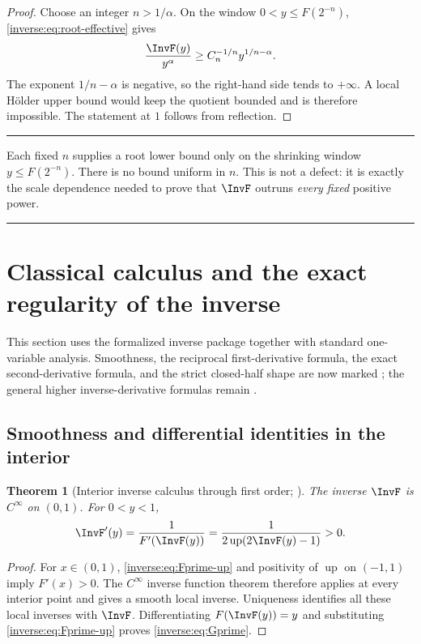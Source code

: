 \documentclass[11pt,oneside]{article}
\newtheorem{theorem}{Theorem}[section]
\theoremstyle{definition}
\theoremstyle{remark}
\newcommand{\Up}{\operatorname{up}}
\newenvironment{boxedremark}{%
  \par\smallskip\noindent\begin{center}\begin{minipage}{0.94\textwidth}%
  \color{black}\hrule\vspace{0.6em}\small
}{%
  \vspace{0.6em}\hrule\end{minipage}\end{center}\smallskip
}
\begin{document}
\begin{proof}
Choose an integer $n>1/\alpha$.  On the window
$0<y\leq F(2^{-n})$, \cref{inverse:eq:root-effective} gives
\[
 \frac{\InvF(y)}{y^\alpha}
 \geq C_n^{-1/n}y^{1/n-\alpha}.
\]
The exponent $1/n-\alpha$ is negative, so the right-hand side tends to
$+\infty$.  A local Hölder upper bound would keep the quotient bounded and
is therefore impossible.  The statement at $1$ follows from reflection.
\end{proof}

\begin{boxedremark}
Each fixed $n$ supplies a root lower bound only on the shrinking window
$y\leq F(2^{-n})$.  There is no bound uniform in $n$.  This is not a
defect: it is exactly the scale dependence needed to prove that
$\InvF$ outruns \emph{every fixed} positive power.
\end{boxedremark}


\section{Classical calculus and the exact regularity of the inverse}
\label{inverse:sec:inverse-calculus}

This section uses the formalized inverse package together with standard
one-variable analysis.  Smoothness, the reciprocal first-derivative formula,
the exact second-derivative formula, and the strict closed-half shape are now
marked \Formalized; the general higher inverse-derivative formulas remain
\Derived.

\subsection{Smoothness and differential identities in the interior}

\begin{theorem}[Interior inverse calculus through first order; \Formalized]
\label{inverse:thm:inverse-calculus}
The inverse $\InvF$ is $C^\infty$ on $(0,1)$.  For $0<y<1$,
\begin{equation}
 \InvF'(y)
   =\frac1{F'(\InvF(y))}
     =\frac1{2\Up(2\InvF(y)-1)}>0.
 \label{inverse:eq:Gprime}
\end{equation}
\end{theorem}

\begin{proof}
For $x\in(0,1)$, \eqref{inverse:eq:Fprime-up} and positivity of $\Up$ on
$(-1,1)$ imply $F'(x)>0$.  The $C^\infty$ inverse function theorem
therefore applies at every interior point and gives a smooth local inverse.
Uniqueness identifies all these local inverses with $\InvF$.  Differentiating
$F(\InvF(y))=y$ and substituting \eqref{inverse:eq:Fprime-up} proves
\eqref{inverse:eq:Gprime}.
\end{proof}
\end{document}
